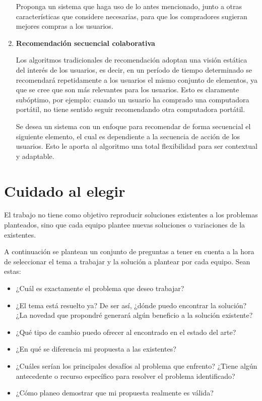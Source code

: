 \documentclass[10pt]{article}
\begin{document}
\begin{enumerate}
			Proponga un sistema que haga uso de lo antes mencionado, junto a otras características que considere necesarias, para que los compradores sugieran mejores compras a los usuarios.
			
			\item \textbf{Recomendación secuencial colaborativa} 
			
			Los algoritmos tradicionales de recomendación adoptan una visión estática del interés de los usuarios, es decir, en un período de tiempo determinado se recomendará repetidamente a los usuarios el mismo conjunto de elementos, ya que se cree que son más relevantes para los usuarios. Esto es claramente subóptimo, por ejemplo: cuando un usuario ha comprado una computadora portátil, no tiene sentido seguir recomendando otra computadora portátil. 
			
			Se desea un sistema con un enfoque para recomendar de forma secuencial el siguiente elemento, el cual es dependiente a la secuencia de acción de los usuarios. Esto le aporta al algoritmo una total flexibilidad para ser contextual y adaptable.
			
		\end{enumerate}
	
	
	\section*{Cuidado al elegir}
	
		El trabajo no tiene como objetivo reproducir soluciones existentes a los problemas planteados, sino que cada equipo plantee nuevas soluciones o variaciones de la existentes. 
		
		A continuación se plantean un conjunto de preguntas a tener en cuenta a la hora de seleccionar el tema a trabajar y la solución a plantear por cada equipo. Sean estas:
		\begin{itemize}
			
			\item ¿Cuál es exactamente el problema que deseo trabajar?
			
			\item ¿El tema está resuelto ya? De ser así, ¿dónde puedo encontrar la solución? ¿La novedad que propondré generará algún beneficio a la solución existente?
			
			\item ¿Qué tipo de cambio puedo ofrecer al encontrado en el estado del arte?
			
			\item ¿En qué se diferencia mi propuesta a las existentes?
			
			\item ¿Cuáles serían los principales desafíos al problema que enfrento? ¿Tiene algún antecedente o recurso específico para resolver el problema identificado? 
			
			\item ¿Cómo planeo demostrar que mi propuesta realmente es válida?
			
		\end{itemize}
	
\end{document}
